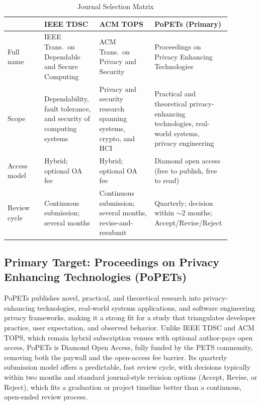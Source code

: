 \documentclass[sigconf,balance=false]{acmart}
\begin{document}
\begin{table}[h]
  \caption{Journal Selection Matrix}
  \label{tab:journals}
  \small
  \begin{tabular}{p{0.16\linewidth}p{0.24\linewidth}p{0.24\linewidth}p{0.24\linewidth}}
    \toprule
     & \textbf{IEEE TDSC} & \textbf{ACM TOPS} & \textbf{PoPETs (Primary)} \\
    \midrule
    Full name &
      IEEE Trans.\ on Dependable and Secure Computing &
      ACM Trans.\ on Privacy and Security &
      Proceedings on Privacy Enhancing Technologies \\
    \addlinespace
    Scope &
      Dependability, fault tolerance, and security of computing systems &
      Privacy and security research spanning systems, crypto, and HCI &
      Practical and theoretical privacy-enhancing technologies, real-world systems, privacy engineering \\
    \addlinespace
    Access model &
      Hybrid; optional OA fee &
      Hybrid; optional OA fee &
      Diamond open access (free to publish, free to read) \\
    \addlinespace
    Review cycle &
      Continuous submission; several months &
      Continuous submission; several months, revise-and-resubmit &
      Quarterly; decision within $\sim$2 months; Accept/Revise/Reject \\
    \bottomrule
  \end{tabular}
\end{table}

\subsection{Primary Target: Proceedings on Privacy Enhancing Technologies (PoPETs)}

PoPETs publishes novel, practical, and theoretical research into
privacy-enhancing technologies, real-world systems applications, and
software engineering privacy frameworks, making it a strong fit for a study
that triangulates developer practice, user expectation, and observed
behavior. Unlike IEEE TDSC and ACM TOPS, which remain hybrid subscription
venues with optional author-pays open access, PoPETs is Diamond Open
Access, fully funded by the PETS community, removing both the paywall and
the open-access fee barrier. Its quarterly submission model offers a
predictable, fast review cycle, with decisions typically within two months
and standard journal-style revision options (Accept, Revise, or Reject),
which fits a graduation or project timeline better than a continuous,
open-ended review process.
\end{document}

